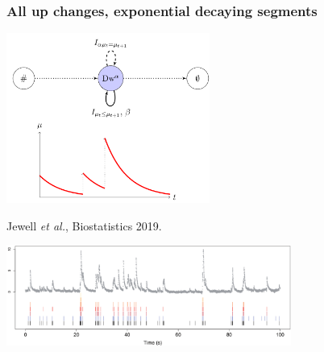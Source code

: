 \documentclass{beamer}
\begin{document}



\begin{frame}
  \frametitle{All up changes, exponential decaying segments}
  \includegraphics[width=0.5\textwidth]{gfpop-decay}

  Jewell \emph{et al.}, Biostatistics 2019.

  \includegraphics[width=0.7\textwidth]{intro-neuroscience} 

\end{frame}


\end{document}
